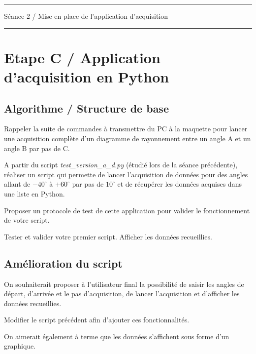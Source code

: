 \documentclass[a4paper,11pt,titlepage]{article} %
\begin{document}
\vspace{0.5cm}

\noindent \rule{\linewidth}{1pt}

{\noindent\Large \rule[-7pt]{0pt}{30pt} Séance 2 /  Mise en place de l'application d'acquisition} 

\noindent \rule{\linewidth}{1pt}


\section{Etape C / Application d'acquisition en Python}


\subsection{Algorithme / Structure de base}

\Quest Rappeler la suite de commandes à transmettre du PC à la maquette pour lancer une acquisition complète d'un diagramme de rayonnement entre un angle A et un angle B par pas de C.

\Manip A partir du script \textsl{test\_version\_a\_d.py} (étudié lors de la séance précédente), réaliser un script qui permette de lancer l'acquisition de données pour des angles allant de $-40^\circ{}$ à $+60^\circ{}$ par pas de $10^\circ{}$ et de récupérer les données acquises dans une liste en Python.

\medskip

\Quest Proposer un protocole de test de cette application pour valider le fonctionnement de votre script.

\Manip Tester et valider votre premier script. Afficher les données recueillies.

\medskip

\subsection{Amélioration du script}

On souhaiterait proposer à l'utilisateur final la possibilité de saisir les angles de départ, d'arrivée et le pas d'acquisition, de lancer l'acquisition et d'afficher les données recueillies.

\Manip Modifier le script précédent afin d'ajouter ces fonctionnalités.

\medskip

On aimerait également à terme que les données s'affichent sous forme d'un graphique.
\end{document}
